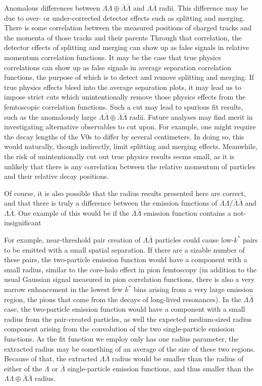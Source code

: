 Anomalous differences between $\Lambda\Lambda\oplus\bar{\Lambda}\bar{\Lambda}$ and $\Lambda\bar{\Lambda}$ radii.
This difference may be due to over- or under-corrected detector effects such as splitting and merging.
There is some correlation between the measured positions of charged tracks and the momenta of those tracks and their parents
Through that correlation, the detector effects of splitting and merging can show up as false signals in relative momentum correlation functions.
It may be the case that true physics correlations can show up as false signals in average separation correlation functions, the purpose of which is to detect and remove splitting and merging.
If true physics effects bleed into the average separation plots, it may lead us to impose strict cuts which unintentionally remove those physics effects from the femtoscopic correlation functions.
Such a cut may lead to spurious fit results, such as the anomalously large $\Lambda\bar{\Lambda}\oplus\bar{\Lambda}\bar{\Lambda}$ radii.
Future analyses may find merit in investigating alternative observables to cut upon.
For example, one might require the decay lengths of the V0s to differ by several centimeters.
In doing so, this would naturally, though indirectly, limit splitting and merging effects.
Meanwhile, the risk of unintentionally cut out true physics results seems small, as it is unlikely that there is any correlation between the relative momentum of particles and their relative decay positions.

Of course, it is also possible that the radius results presented here are correct, and that there is truly a difference between the emission functions of $\Lambda\Lambda$/$\bar{\Lambda}\bar{\Lambda}$ and $\Lambda\bar{\Lambda}$.
One example of this would be if the $\Lambda\bar{\Lambda}$ emission function contains a not-insignificant

For example, near-threshold pair creation of $\Lambda\bar{\Lambda}$ particles could cause low-$k^*$ pairs to be emitted with a small spatial separation.
If there are a sizable number of these pairs, the two-particle emission function would have a component with a small radius, similar to the core-halo effect in pion femtoscopy (in addition to the usual Gaussian signal measured in pion correlation functions, there is also a very narrow enhancement in the lowest few $k^*$ bins arising from a very large emission region, the pions that come from the decays of long-lived resonances).
In the $\Lambda\bar{\Lambda}$ case, the two-particle emission function would have a component with a small radius from the pair-created particles, as well the expected medium-sized radius component arising from the convolution of the two single-particle emission functions.
As the fit function we employ only has one radius parameter, the extracted radius may be something of an average of the size of these two regions.
Because of that, the extracted $\Lambda\bar{\Lambda}$ radius would be smaller than the radius of either of the $\Lambda$ or $\bar{\Lambda}$ single-particle emission functions, and thus smaller than the $\Lambda\Lambda\oplus\bar{\Lambda}\bar{\Lambda}$ radius.

